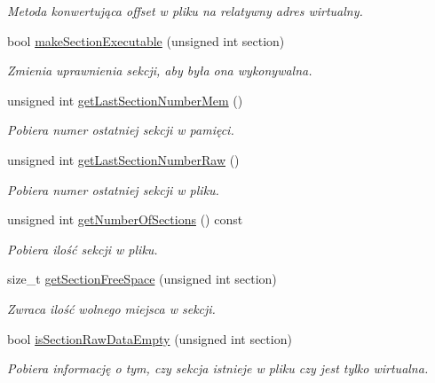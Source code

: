 \begin{DoxyCompactItemize}
\begin{DoxyCompactList}\small\item\em Metoda konwertująca offset w pliku na relatywny adres wirtualny. \end{DoxyCompactList}\item 
bool \hyperlink{class_p_e_file_a32d068523df3459778388478cd07b54a}{make\-Section\-Executable} (unsigned int section)
\begin{DoxyCompactList}\small\item\em Zmienia uprawnienia sekcji, aby była ona wykonywalna. \end{DoxyCompactList}\item 
unsigned int \hyperlink{class_p_e_file_adf019ed888aee58b468411366b9b60c5}{get\-Last\-Section\-Number\-Mem} ()
\begin{DoxyCompactList}\small\item\em Pobiera numer ostatniej sekcji w pamięci. \end{DoxyCompactList}\item 
unsigned int \hyperlink{class_p_e_file_a6d42fa783714881ebb5107ac95da02d6}{get\-Last\-Section\-Number\-Raw} ()
\begin{DoxyCompactList}\small\item\em Pobiera numer ostatniej sekcji w pliku. \end{DoxyCompactList}\item 
unsigned int \hyperlink{class_p_e_file_a704f552cbaaed1d1f62e3e5a95c6dd67}{get\-Number\-Of\-Sections} () const 
\begin{DoxyCompactList}\small\item\em Pobiera ilość sekcji w pliku. \end{DoxyCompactList}\item 
size\-\_\-t \hyperlink{class_p_e_file_a9a0464cc0e03f110597d6abd66e08007}{get\-Section\-Free\-Space} (unsigned int section)
\begin{DoxyCompactList}\small\item\em Zwraca ilość wolnego miejsca w sekcji. \end{DoxyCompactList}\item 
bool \hyperlink{class_p_e_file_ab5ab5850cce8abcb48c89e0fa44901ca}{is\-Section\-Raw\-Data\-Empty} (unsigned int section)
\begin{DoxyCompactList}\small\item\em Pobiera informację o tym, czy sekcja istnieje w pliku czy jest tylko wirtualna. \end{DoxyCompactList}\item 

\end{DoxyCompactItemize}
